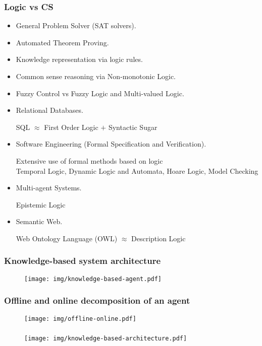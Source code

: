 \documentclass[UTF8,11pt,colorlinks,compress,openany]{beamer}%
\begin{document}
\begin{frame}\frametitle{Logic vs CS}
	\begin{itemize}
		\item General Problem Solver (SAT solvers).
		\item Automated Theorem Proving.
		\item Knowledge representation via logic rules.
		\item Common sense reasoning via Non-monotonic Logic.
		\item Fuzzy Control vs Fuzzy Logic and Multi-valued Logic.
		\item Relational Databases.
		
		SQL $\approx$ First Order Logic $+$ Syntactic Sugar
		\item Software Engineering (Formal Specification and Verification).
		
		Extensive use of formal methods based on logic\\
		Temporal Logic, Dynamic Logic and Automata, Hoare Logic, Model Checking
		\item Multi-agent Systems.
		
		Epistemic Logic
		\item Semantic Web.
		
		Web Ontology Language (OWL) $\approx$ Description Logic
	\end{itemize}
\end{frame}

\begin{frame}\frametitle{Knowledge-based system architecture}
\begin{figure}[H]
	\texttt{[image: img/knowledge-based-agent.pdf]}
\end{figure}
\end{frame}

\begin{frame}\frametitle{Offline and online decomposition of an agent}
\begin{figure}[H]
\texttt{[image: img/offline-online.pdf]}
\end{figure}
\end{frame}

\begin{frame}\frametitle{}
\begin{figure}[H]
\texttt{[image: img/knowledge-based-architecture.pdf]}
\end{figure}
\end{frame}
\end{document}
